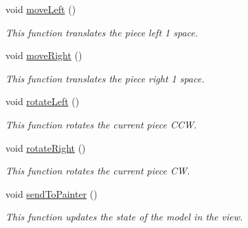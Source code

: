 \begin{DoxyCompactItemize}
void \hyperlink{class_project_tetris_1_1_group11_1_1_controller_1_1_tetris_controller_a3d7ce2d5ac30aef5c409a04dc934d6e0}{move\+Left} ()
\begin{DoxyCompactList}\small\item\em This function translates the piece left 1 space. \end{DoxyCompactList}\item 
\hypertarget{class_project_tetris_1_1_group11_1_1_controller_1_1_tetris_controller_a51d583e56759a19f1fb806f4faa86949}{}\label{class_project_tetris_1_1_group11_1_1_controller_1_1_tetris_controller_a51d583e56759a19f1fb806f4faa86949} 
void \hyperlink{class_project_tetris_1_1_group11_1_1_controller_1_1_tetris_controller_a51d583e56759a19f1fb806f4faa86949}{move\+Right} ()
\begin{DoxyCompactList}\small\item\em This function translates the piece right 1 space. \end{DoxyCompactList}\item 
\hypertarget{class_project_tetris_1_1_group11_1_1_controller_1_1_tetris_controller_a7cdb33ab4ffa50deff495173d99ca8d1}{}\label{class_project_tetris_1_1_group11_1_1_controller_1_1_tetris_controller_a7cdb33ab4ffa50deff495173d99ca8d1} 
void \hyperlink{class_project_tetris_1_1_group11_1_1_controller_1_1_tetris_controller_a7cdb33ab4ffa50deff495173d99ca8d1}{rotate\+Left} ()
\begin{DoxyCompactList}\small\item\em This function rotates the current piece C\+CW. \end{DoxyCompactList}\item 
\hypertarget{class_project_tetris_1_1_group11_1_1_controller_1_1_tetris_controller_a5f6b48a2bbf8b617e801f838d1aa4a48}{}\label{class_project_tetris_1_1_group11_1_1_controller_1_1_tetris_controller_a5f6b48a2bbf8b617e801f838d1aa4a48} 
void \hyperlink{class_project_tetris_1_1_group11_1_1_controller_1_1_tetris_controller_a5f6b48a2bbf8b617e801f838d1aa4a48}{rotate\+Right} ()
\begin{DoxyCompactList}\small\item\em This function rotates the current piece CW. \end{DoxyCompactList}\item 
\hypertarget{class_project_tetris_1_1_group11_1_1_controller_1_1_tetris_controller_a061770a9dd0596e04e14e186cfad2523}{}\label{class_project_tetris_1_1_group11_1_1_controller_1_1_tetris_controller_a061770a9dd0596e04e14e186cfad2523} 
void \hyperlink{class_project_tetris_1_1_group11_1_1_controller_1_1_tetris_controller_a061770a9dd0596e04e14e186cfad2523}{send\+To\+Painter} ()
\begin{DoxyCompactList}\small\item\em This function updates the state of the model in the view. \end{DoxyCompactList}\end{DoxyCompactItemize}


